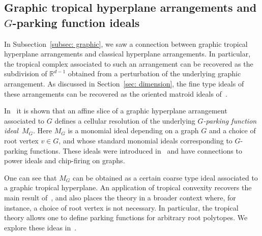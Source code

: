 \subsection{Graphic tropical hyperplane arrangements and \texorpdfstring{$G$}{G}-parking function ideals}

In Subsection~\ref{subsec: graphic}, we saw a connection between graphic tropical hyperplane arrangements and classical hyperplane arrangements.
In particular, the tropical complex associated to such an arrangement can be recovered as the subdivision of ${\mathbb R}^{d-1}$ obtained from a perturbation of the underlying graphic arrangement.  As discussed in Section~\ref{sec: dimension}, the fine type ideals of these arrangements can be recovered as the oriented matroid ideals of~\cite{NPS}.

In~\cite{DocSan} it is shown that an affine slice of a graphic hyperplane arrangement associated to $G$ defines a cellular resolution of the underlying \emph{$G$-parking function ideal}~$M_G$.  Here $M_G$ is a monomial ideal depending on a graph $G$ and a choice of root vertex $v \in G$, and whose standard monomial ideals corresponding to $G$-parking functions. These ideals were introduced in~\cite{postnikovshapiro} and have connections to power ideals and chip-firing on graphs.

One can see that $M_G$ can be obtained as a certain coarse type ideal associated to a graphic tropical hyperplane.  An application of tropical convexity recovers the main result of~\cite{DocSan}, and also places the theory in a broader context where, for instance, a choice of root vertex is not necessary.  In particular, the tropical theory allows one to define parking functions for arbitrary root polytopes.  We explore these ideas in~\cite{ADSparking}.

